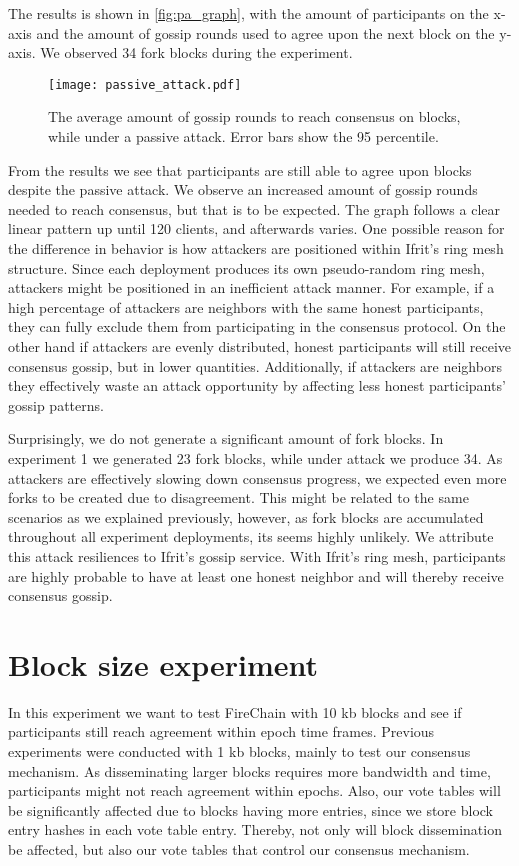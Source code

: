 \documentclass[USenglish]{uit-thesis}
\begin{document}
The results is shown in \autoref{fig:pa_graph}, with the amount of participants on the x-axis and the amount of gossip rounds used to agree upon the next block on the y-axis.
We observed 34 fork blocks during the experiment.
\begin{figure}[h]
	\centering
	\texttt{[image: passive\_attack.pdf]}
	\caption{The average amount of gossip rounds to reach consensus on blocks, while under a passive attack. Error bars show the 95 percentile.  }
	\label{fig:pa_graph}
\end{figure}

From the results we see that participants are still able to agree upon blocks despite the passive attack.
We observe an increased amount of gossip rounds needed to reach consensus, but that is to be expected.
The graph follows a clear linear pattern up until 120 clients, and afterwards varies.
One possible reason for the difference in behavior is how attackers are positioned within Ifrit's ring mesh structure.
Since each deployment produces its own pseudo-random ring mesh, attackers might be positioned in an inefficient attack manner.
For example, if a high percentage of attackers are neighbors with the same honest participants, they can fully exclude them from participating in the consensus protocol.
On the other hand if attackers are evenly distributed, honest participants will still receive consensus gossip, but in lower quantities.
Additionally, if attackers are neighbors they effectively waste an attack opportunity by affecting less honest participants' gossip patterns. 



Surprisingly, we do not generate a significant amount of fork blocks.
In experiment 1 we generated 23 fork blocks, while under attack we produce 34.
As attackers are effectively slowing down consensus progress, we expected even more forks to be created due to disagreement.
This might be related to the same scenarios as we explained previously, however, as fork blocks are accumulated throughout all experiment deployments, its seems highly unlikely.
We attribute this attack resiliences to Ifrit's gossip service.
With Ifrit's ring mesh, participants are highly probable to have at least one honest neighbor and will thereby receive consensus gossip.




\section{Block size experiment}
In this experiment we want to test FireChain with 10 \gls{kb} blocks and see if participants still reach agreement within epoch time frames.
Previous experiments were conducted with 1 \gls{kb} blocks, mainly to test our consensus mechanism.
As disseminating larger blocks requires more bandwidth and time, participants might not reach agreement within epochs.
Also, our vote tables will be significantly affected due to blocks having more entries, since we store block entry hashes in each vote table entry.
Thereby, not only will block dissemination be affected, but also our vote tables that control our consensus mechanism.
 
\end{document}
